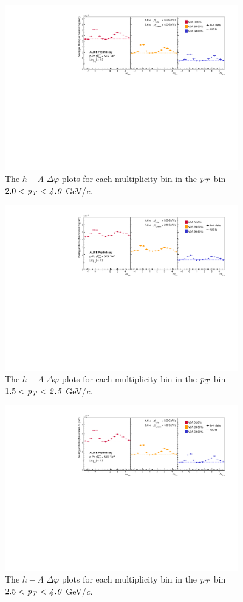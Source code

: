\documentclass[ALICE,manyauthors]{ALICE_analysis_notes}
\begin{document}
\begin{itemize}
\begin{figure}[ht]
\centering
\includegraphics[width=4in]{figures/h_lambda_dphi_all_2_4.pdf}
\caption{The $h-\Lambda$ $\Delta\varphi$ plots for each multiplicity bin in the $\it{p}_T$ bin $2.0 < \it{p}_T < 4.0$ GeV/\it{c}.}
\label{h-lambda_dphi_all_2_4}
\end{figure}



\begin{figure}[ht]
\centering
\includegraphics[width=4in]{figures/h_lambda_dphi_all_15_25.pdf}
\caption{The $h-\Lambda$ $\Delta\varphi$ plots for each multiplicity bin in the $\it{p}_T$ bin $1.5 < \it{p}_T < 2.5$ GeV/\it{c}.}
\label{h-lambda_dphi_all_15_25}
\end{figure}

\begin{figure}[ht]
\centering
\includegraphics[width=4in]{figures/h_lambda_dphi_all_25_40.pdf}
\caption{The $h-\Lambda$ $\Delta\varphi$ plots for each multiplicity bin in the $\it{p}_T$ bin $2.5 < \it{p}_T < 4.0$ GeV/\it{c}.}
\label{h-lambda_dphi_all_25_40}
\end{figure}




\end{itemize}
\end{document}
